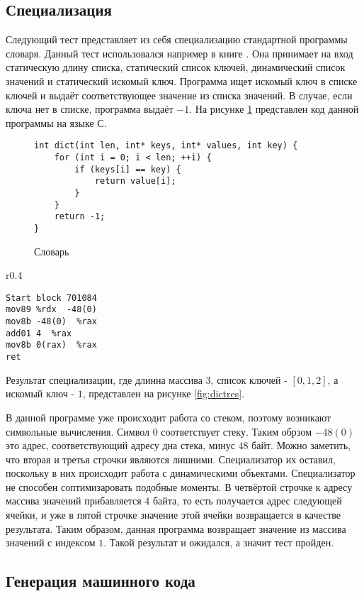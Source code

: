 \documentclass{spbau-diploma}
\begin{document}
\subsection{ Специализация}
Следующий тест представляет из себя специализацию стандартной программы словаря. Данный тест использовался например в книге \cite{PEAPG}. Она принимает на вход статическую длину списка, статический список ключей, динамический список значений и статический искомый ключ. Программа ищет искомый ключ в списке ключей и выдаёт соответствующее значение из списка значений. В случае, если ключа нет в списке, программа выдаёт $-1$. На рисунке \ref{fig:dict} представлен код данной программы на языке С.
\begin{figure}[h]
\begin{lstlisting}[xleftmargin = 20pt]
int dict(int len, int* keys, int* values, int key) {
    for (int i = 0; i < len; ++i) {
        if (keys[i] == key) {
            return value[i];
        }
    }
    return -1;
}
\end{lstlisting}
\caption{ Словарь}
\label{fig:dict}
\end{figure}
\begin{wrapfigure}{r}{0.4\textwidth}
\begin{lstlisting}[xleftmargin = 20pt]
Start block 701084
mov89 %rdx  -48(0) 
mov8b -48(0)  %rax 
add01 4  %rax 
mov8b 0(rax)  %rax 
ret
\end{lstlisting}
\caption{ Результат специализации}
\label{fig:dictres}
\end{wrapfigure}
Результат специализации, где длинна массива $3$, список ключей - $[0, 1, 2]$, а искомый ключ - $1$, представлен на рисунке \ref{fig:dictres}.

В данной программе уже происходит работа со стеком, поэтому возникают символьные вычисления. Символ $0$ соответствует стеку. Таким обрзом $-48(0)$ это адрес, соответствующий адресу дна стека, минус $48$ байт. Можно заметить, что вторая и третья строчки являются лишними. Специализатор их оставил, поскольку в них происходит работа с динамическими объектами. Специализатор не способен соптимизаровать подобные моменты. В четвёртой строчке к адресу массива значений прибавляется $4$ байта, то есть получается адрес следующей ячейки, и уже в пятой строчке значение этой ячейки возвращается в качестве результата. Таким образом, данная программа возвращает значение из массива значений с индексом $1$. Такой результат и ожидался, а значит тест пройден.

\subsection{ Генерация машинного кода}
\end{document}
